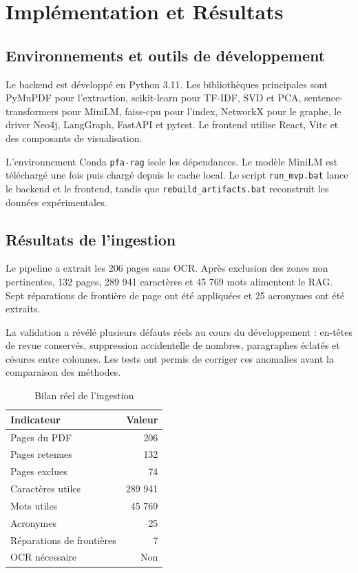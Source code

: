 \documentclass[12pt,a4paper,oneside]{report}
\newcommand{\tech}[1]{\texttt{#1}}
\begin{document}
\chapter{Implémentation et Résultats}

\section{Environnements et outils de développement}
Le backend est développé en Python 3.11. Les bibliothèques principales sont PyMuPDF pour l'extraction, scikit-learn pour TF-IDF, SVD et PCA, sentence-transformers pour MiniLM, faiss-cpu pour l'index, NetworkX pour le graphe, le driver Neo4j, LangGraph, FastAPI et pytest. Le frontend utilise React, Vite et des composants de visualisation.

L'environnement Conda \tech{pfa-rag} isole les dépendances. Le modèle MiniLM est téléchargé une fois puis chargé depuis le cache local. Le script \tech{run\_mvp.bat} lance le backend et le frontend, tandis que \tech{rebuild\_artifacts.bat} reconstruit les données expérimentales.

\section{Résultats de l'ingestion}
Le pipeline a extrait les 206 pages sans OCR. Après exclusion des zones non pertinentes, 132 pages, 289 941 caractères et 45 769 mots alimentent le RAG. Sept réparations de frontière de page ont été appliquées et 25 acronymes ont été extraits.

La validation a révélé plusieurs défauts réels au cours du développement : en-têtes de revue conservés, suppression accidentelle de nombres, paragraphes éclatés et césures entre colonnes. Les tests ont permis de corriger ces anomalies avant la comparaison des méthodes.

\begin{table}[H]
\centering
\caption{Bilan réel de l'ingestion}
\begin{tabular}{lr}
\toprule
\textbf{Indicateur} & \textbf{Valeur}\\
\midrule
Pages du PDF & 206\\
Pages retenues & 132\\
Pages exclues & 74\\
Caractères utiles & 289 941\\
Mots utiles & 45 769\\
Acronymes & 25\\
Réparations de frontières & 7\\
OCR nécessaire & Non\\
\bottomrule
\end{tabular}
\end{table}
\end{document}
